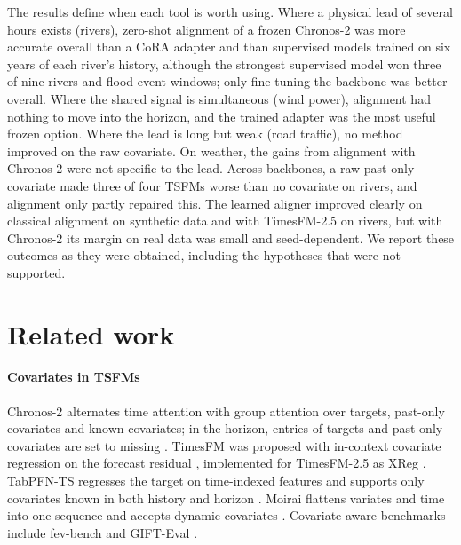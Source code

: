 \documentclass[preprint,11pt,authoryear]{elsarticle}
\begin{document}
The results define when each tool is worth using. Where a physical lead of several hours exists (rivers), zero-shot alignment of a frozen Chronos-2 was more accurate overall than a CoRA adapter and than supervised models trained on six years of each river's history, although the strongest supervised model won three of nine rivers and flood-event windows; only fine-tuning the backbone was better overall. Where the shared signal is simultaneous (wind power), alignment had nothing to move into the horizon, and the trained adapter was the most useful frozen option. Where the lead is long but weak (road traffic), no method improved on the raw covariate. On weather, the gains from alignment with Chronos-2 were not specific to the lead. Across backbones, a raw past-only covariate made three of four TSFMs worse than no covariate on rivers, and alignment only partly repaired this. The learned aligner improved clearly on classical alignment on synthetic data and with TimesFM-2.5 on rivers, but with Chronos-2 its margin on real data was small and seed-dependent. We report these outcomes as they were obtained, including the hypotheses that were not supported.

\section{Related work}
\label{sec:related}

\paragraph{Covariates in TSFMs} Chronos-2 alternates time attention with group attention over targets, past-only covariates and known covariates; in the horizon, entries of targets and past-only covariates are set to missing \citep{ansari2025chronos2}. TimesFM was proposed with in-context covariate regression on the forecast residual \citep{das2024timesfm}, implemented for TimesFM-2.5 as XReg \citep{timesfm_github}. TabPFN-TS regresses the target on time-indexed features and supports only covariates known in both history and horizon \citep{hoo2025tabpfnts,hollmann2025tabpfn}. Moirai flattens variates and time into one sequence and accepts dynamic covariates \citep{woo2024moirai}. Covariate-aware benchmarks include fev-bench \citep{shchur2025fevbench} and GIFT-Eval \citep{aksu2024gifteval}.
\end{document}

